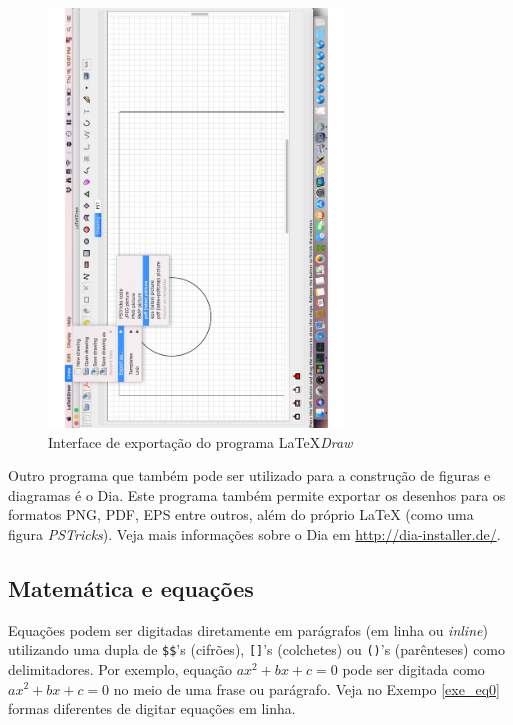 \begin{figure}[H]
\caption{Interface de exportação do programa \LaTeX\textit{Draw}}
\vspace{6mm}
    \begin{center}
        \includegraphics[width=0.7\textwidth,angle=-90]{./docs/figs/ldraw3.pdf}
    \end{center}
\vspace{4mm}
\label{fig:interld}
\end{figure}

\begin{marker}
Outro programa que também pode ser utilizado para a construção de figuras e diagramas é o Dia. Este programa também permite exportar os desenhos para os formatos PNG, PDF, EPS entre outros, além do próprio \LaTeX{} (como uma figura \textit{PSTricks}). Veja mais informações sobre o Dia em \url{http://dia-installer.de/}.
\end{marker}

\subsection{Matemática e equações}
\label{sec:mat_eqs}

Equações podem ser digitadas diretamente em parágrafos (em linha ou \textit{inline}) utilizando uma dupla de {\tt \$\$}'s (cifrões), {\tt []}'s (colchetes) ou \texttt{()}'s (parênteses) como delimitadores. Por exemplo, equação $ax^2 + bx + c = 0$ pode ser digitada como \texttt{$ax^2 + bx + c = 0$} no meio de uma frase ou parágrafo. Veja no Exempo \ref{exe_eq0} formas diferentes de digitar equações em linha.

